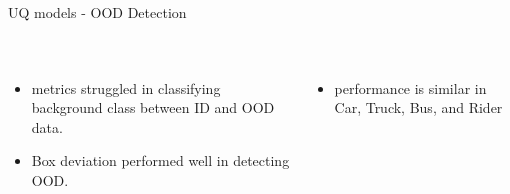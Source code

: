 \documentclass[10pt, aspectratio=169]{beamer}
\begin{document}
\begin{frame}[allowframebreaks]{UQ models - OOD Detection}
\begin{table}[tbp]
{\begin{tabular}{lllllllllllc}
        \end{tabular}%
        }
        \end{table}
        \begin{columns}
                \begin{itemize}
                    \item metrics struggled in classifying background class between ID and OOD data.
                    \item Box deviation performed well in detecting OOD.
                \end{itemize}
                \begin{itemize}
                    \item performance is similar in Car, Truck, Bus, and Rider 
                \end{itemize}
        \end{columns}
        \pagebreak


\end{frame}
\end{document}
